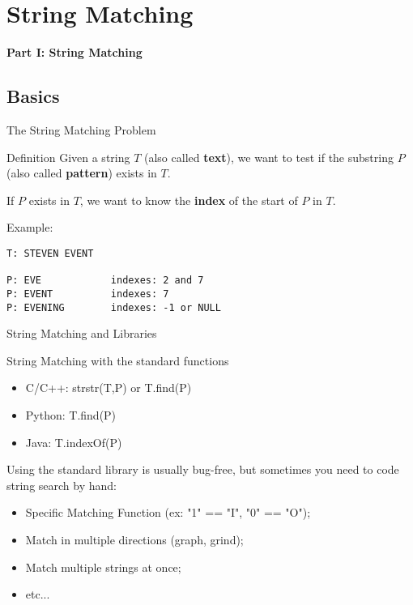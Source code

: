 

\section{String Matching}

\begin{frame}
  \begin{center}
    {\bf Part I: String Matching}
  \end{center}
\end{frame}

\subsection{Basics}

\begin{frame}[fragile]{The String Matching Problem}
  \begin{block}{Definition}
    Given a string $T$ (also called {\bf text}), we want to test if the substring $P$ (also called {\bf pattern}) exists in $T$.
    \bigskip

    If $P$ exists in $T$, we want to know the {\bf index} of the start of $P$ in $T$.
  \end{block}\bigskip

  Example:
\begin{verbatim}
T: STEVEN EVENT

P: EVE            indexes: 2 and 7
P: EVENT          indexes: 7
P: EVENING        indexes: -1 or NULL
\end{verbatim}
\end{frame}

\begin{frame}{String Matching and Libraries}

  \begin{block}{String Matching with the standard functions}
    \begin{itemize}
      \item C/C++: strstr(T,P) or T.find(P)
      \item Python: T.find(P)
      \item Java: T.indexOf(P)
    \end{itemize}
  \end{block}

  Using the standard library is usually bug-free, but sometimes you need to code string search by hand:
  \begin{itemize}
    \item Specific Matching Function (ex: "1" == "I", "0" == "O");
    \item Match in multiple directions (graph, grind);
    \item Match multiple strings at once;
    \item etc...
  \end{itemize}\bigskip
\end{frame}

